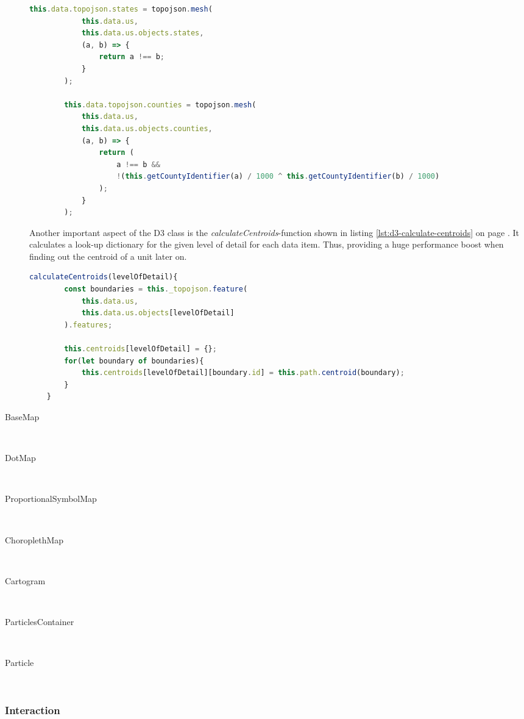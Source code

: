\begin{description}
\begin{lstlisting}[language=JavaScript, caption={TopoJSON usage on the client with the adaption of merging all geographic information.}, label={lst:d3-topojson}]
        this.data.topojson.states = topojson.mesh(
            this.data.us,
            this.data.us.objects.states,
            (a, b) => {
                return a !== b;
            }
        );

        this.data.topojson.counties = topojson.mesh(
            this.data.us,
            this.data.us.objects.counties,
            (a, b) => {
                return (
                    a !== b &&
                    !(this.getCountyIdentifier(a) / 1000 ^ this.getCountyIdentifier(b) / 1000)
                );
            }
        );
\end{lstlisting}

Another important aspect of the \ac{D3} class is the \textit{calculateCentroids}-function shown in listing \ref{lst:d3-calculate-centroids} on page \pageref{lst:d3-calculate-centroids}. It calculates a look-up dictionary for the given level of detail for each data item. Thus, providing a huge performance boost when finding out the centroid of a unit later on.

\begin{lstlisting}[language=JavaScript, caption={Calculate a look-up dictionary for all data items depending on the level of detail.}, label={lst:d3-calculate-centroids}]
    calculateCentroids(levelOfDetail){
        const boundaries = this._topojson.feature(
            this.data.us,
            this.data.us.objects[levelOfDetail]
        ).features;

        this.centroids[levelOfDetail] = {};
        for(let boundary of boundaries){
            this.centroids[levelOfDetail][boundary.id] = this.path.centroid(boundary);
        }
    }
\end{lstlisting}

\item[BaseMap] \hfill \\

\item[DotMap] \hfill \\
\item[ProportionalSymbolMap] \hfill \\
\item[ChoroplethMap] \hfill \\
\item[Cartogram] \hfill \\
\item[ParticlesContainer] \hfill \\
\item[Particle] \hfill \\
\end{description}


\subsubsection{Interaction}
